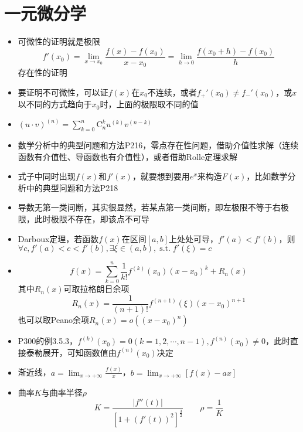 \documentclass[UTF8]{ctexart}
\DeclareMathOperator{\st}{s.t.}
\begin{document}
\section{一元微分学}
\begin{itemize}
\item 可微性的证明就是极限
\[
f'(x_0) = \lim_{x\to x_0} \frac{f(x)-f(x_0)}{x-x_0} = \lim_{h\to 0} \frac{f(x_0+h)-f(x_0)}{h}
\]
存在性的证明

\item 要证明不可微性，可以证$f(x)$在$x_0$不连续，或者$f_+'(x_0)\neq f_-'(x_0)$，或$x$以不同的方式趋向于$x_0$时，上面的极限取不同的值

\item $(u\cdot v)^{(n)} = \sum_{k=0}^n \text{C}_n^k u^{(k)}v^{(n-k)}$

\item 数学分析中的典型问题和方法P216，零点存在性问题，借助介值性求解（连续函数有介值性、导函数也有介值性），或者借助Rolle定理求解

\item 式子中同时出现$f(x)$和$f'(x)$，就要想到要用$e^x$来构造$F(x)$，比如数学分析中的典型问题和方法P218

\item 导数无第一类间断，其实很显然，若某点第一类间断，即左极限不等于右极限，此时极限不存在，即该点不可导

\item Darboux定理，若函数$f(x)$在区间$[a,b]$上处处可导，$f'(a)<f'(b)$，则$\forall c,f'(a)<c<f'(b),\exists \xi \in (a,b),\st f'(\xi)=c$

\item
\[
f(x) = \sum_{k=0}^n \frac{1}{k!}f^{(k)}(x_0)(x-x_0)^k + R_n(x)
\]
其中$R_n(x)$可取拉格朗日余项
\[
R_n(x) = \frac{1}{(n+1)!}f^{(n+1)}(\xi)(x-x_0)^{n+1}
\]
也可以取Peano余项$R_n(x)=o((x-x_0)^n)$

\item P300的例3.5.3，$f^{(k)}(x_0)=0(k=1,2,\cdots,n-1),f^{(n)}(x_0)\neq0$，此时直接泰勒展开，可知函数值由$f^{(n)}(x_0)$决定

\item 渐近线，$a=\lim_{x\to +\infty}\frac{f(x)}{x}$，$b=\lim_{x\to +\infty}[f(x)-ax]$

\item 曲率$K$与曲率半径$\rho$
\[
	K = \frac{|f''(t)|}{[1+(f'(t))^2]^{\frac{3}{2}}} \qquad\rho = \frac{1}{K}
\]


\end{itemize}
\end{document}

